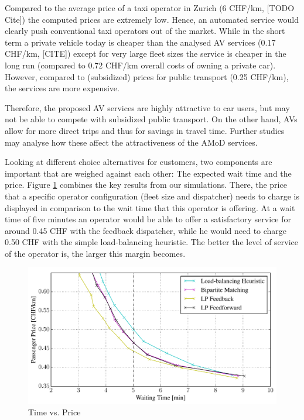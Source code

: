 Compared to the average price of a taxi operator in Zurich (6 CHF/km, [TODO Cite])
the computed prices are extremely low. Hence, an automated service would clearly
push conventional taxi operators out of the market. While in the short term a
private vehicle today is cheaper than the analysed AV services (0.17 CHF/km, [CITE])
except for very large fleet sizes the service is cheaper in the long run (compared
to 0.72 CHF/km overall costs of owning a private car). However, compared to
(subsidized) prices for public transport (0.25 CHF/km), the services are more
expensive.

Therefore, the proposed AV services are highly attractive to car users, but may
not be able to compete with subsidized public transport. On the other hand, AVs
allow for more direct trips and thus for savings in travel time. Further studies
may analyse how these affect the attractiveness of the AMoD services.

Looking at different choice alternatives for customers, two components are important
that are weighed against each other: The expected wait time and the price. Figure
\ref{fig:time_vs_price} combines the key results from our simulations. There,
the price that a specific operator configuration (fleet size and dispatcher)
needs to charge is
displayed in comparison to the wait time that this operator is offering.
At a wait time of five minutes an operator would be able to offer a satisfactory service
for around 0.45 CHF with the feedback dispatcher, while he would need to charge
0.50 CHF with the simple load-balancing heuristic. The better the level of service
of the operator is, the larger this margin becomes.

\begin{figure}
\includegraphics[width=1.0\textwidth]{figures/time_vs_price.pdf}
\caption{Time vs. Price}
\label{fig:time_vs_price}
\end{figure}

